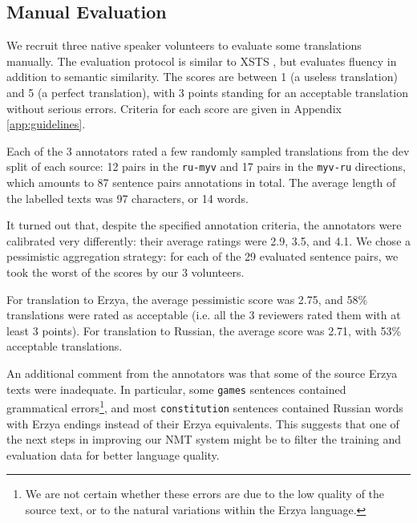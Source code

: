 \documentclass[11pt]{article}
\begin{document}
\subsection{Manual Evaluation}
\label{sec:manual}
We recruit three native speaker volunteers to evaluate some translations manually. The evaluation protocol is similar to XSTS \cite{nllb2022}, but evaluates fluency in addition to semantic similarity. The scores are between 1 (a useless translation) and 5 (a perfect translation), with 3 points standing for an acceptable translation without serious errors. Criteria for each score are given in Appendix \ref{app:guidelines}.

Each of the 3 annotators rated a few randomly sampled translations from the dev split of each source: 12 pairs in the \texttt{ru-myv} and 17 pairs in the \texttt{myv-ru} directions, which amounts to 87 sentence pairs annotations in total. The average length of the labelled texts was 97 characters, or 14 words.

It turned out that, despite the specified annotation criteria, the annotators were calibrated very differently: their average ratings were 2.9, 3.5, and 4.1. We chose a pessimistic aggregation strategy: for each of the 29 evaluated sentence pairs, we took the worst of the scores by our 3 volunteers.

For translation to Erzya, the average pessimistic score was 2.75, and 58\% translations were rated as acceptable (i.e. all the 3 reviewers rated them with at least 3 points). For translation to Russian, the average score was 2.71, with 53\% acceptable translations.

An additional comment from the annotators was that some of the source Erzya texts were inadequate. In particular, some \texttt{games} sentences contained grammatical errors\footnote{We are not certain whether these errors are due to the low quality of the source text, or to the natural variations within the Erzya language.}, and most \texttt{constitution} sentences contained Russian words with Erzya endings instead of their Erzya equivalents. This suggests that one of the next steps in improving our NMT system might be to filter the training and evaluation data for better language quality.
\end{document}
